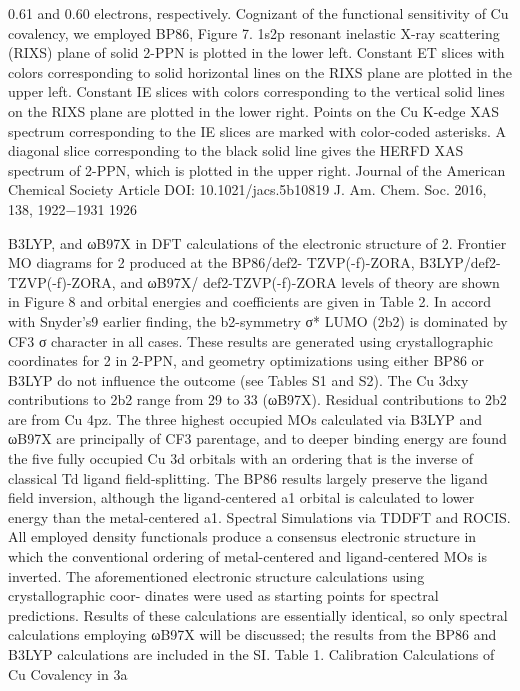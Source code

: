 0.61 and 0.60 electrons, respectively. Cognizant of the
functional sensitivity of Cu covalency, we employed BP86,
Figure 7. 1s2p resonant inelastic X-ray scattering (RIXS) plane of
solid 2-PPN is plotted in the lower left. Constant ET slices with colors
corresponding to solid horizontal lines on the RIXS plane are plotted
in the upper left. Constant IE slices with colors corresponding to the
vertical solid lines on the RIXS plane are plotted in the lower right.
Points on the Cu K-edge XAS spectrum corresponding to the IE slices
are marked with color-coded asterisks. A diagonal slice corresponding
to the black solid line gives the HERFD XAS spectrum of 2-PPN,
which is plotted in the upper right.
Journal of the American Chemical Society
Article
DOI: 10.1021/jacs.5b10819
J. Am. Chem. Soc. 2016, 138, 1922−1931
1926


B3LYP, and ωB97X in DFT calculations of the electronic
structure of 2.
Frontier MO diagrams for 2 produced at the BP86/def2-
TZVP(-f)-ZORA, B3LYP/def2-TZVP(-f)-ZORA, and ωB97X/
def2-TZVP(-f)-ZORA levels of theory are shown in Figure 8
and orbital energies and coeﬃcients are given in Table 2. In
accord with Snyder’s9 earlier ﬁnding, the b2-symmetry σ*
LUMO (2b2) is dominated by CF3 σ character in all cases.
These results are generated using crystallographic coordinates
for 2 in 2-PPN, and geometry optimizations using either BP86
or B3LYP do not inﬂuence the outcome (see Tables S1 and
S2). The Cu 3dxy contributions to 2b2 range from 29%
to 33%
(ωB97X). Residual contributions to 2b2 are from Cu 4pz. The
three highest occupied MOs calculated via B3LYP and ωB97X
are principally of CF3 parentage, and to deeper binding energy
are found the ﬁve fully occupied Cu 3d orbitals with an
ordering that is the inverse of classical Td ligand ﬁeld-splitting.
The BP86 results largely preserve the ligand ﬁeld inversion,
although the ligand-centered a1 orbital is calculated to lower
energy than the metal-centered a1.
Spectral Simulations via TDDFT and ROCIS. All
employed density functionals produce a consensus electronic
structure in which the conventional ordering of metal-centered
and ligand-centered MOs is inverted. The aforementioned
electronic structure calculations using crystallographic coor-
dinates were used as starting points for spectral predictions.
Results of these calculations are essentially identical, so only
spectral calculations employing ωB97X will be discussed; the
results from the BP86 and B3LYP calculations are included in
the SI.
Table 1. Calibration Calculations of Cu Covalency in 3a

